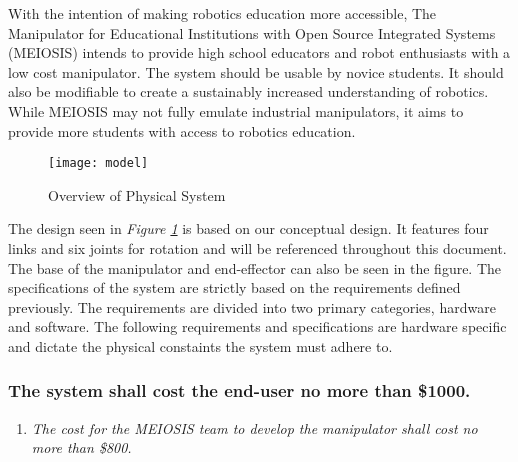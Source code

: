 With the intention of making robotics education more accessible, The Manipulator for Educational Institutions with Open Source Integrated Systems (MEIOSIS) intends to provide high school educators and robot enthusiasts with a low cost manipulator. The system should be usable by novice students. It should also be modifiable to create a sustainably increased understanding of robotics. While MEIOSIS may not fully emulate industrial manipulators, it aims to provide more students with access to robotics education. \\
\begin{figure}[htp]
  \centering
  \texttt{[image: model]}
  \caption{Overview of Physical System}
  \label{fig:model}
\end{figure}
\newline
The design seen in \emph{Figure \ref{fig:model}} is based on our conceptual design. It features four links and six joints for rotation and will be referenced throughout this document. The base of the manipulator and end-effector can also be seen in the figure.
The specifications of the system are strictly based on the requirements defined previously. The requirements are divided into two primary categories, hardware and software.
\vspace{-\baselineskip}
The following requirements and specifications are hardware specific and dictate the physical constaints the system must adhere to.
\vspace{-\baselineskip}
\subsubsection{The system shall cost the end-user no more than \$1000.}
\begin{enumerate}
  \item \textit{The cost for the MEIOSIS team to develop the manipulator shall cost no more than \$800.}
\end{enumerate}
